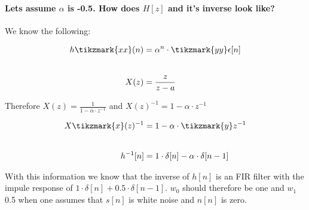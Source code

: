 \paragraph{Lets assume $\alpha$ is -0.5. How does $H[z]$ and it's inverse look like?}
We know the following:\newline
\begin{minipage}{\textwidth}
\begin{align*}
h\tikzmark{xx}(n)&= \alpha^n\cdot\tikzmark{yy}\epsilon[n] \\[2em]
X(z) &= \frac{z}{z-a}
\end{align*}

\end{minipage}
Therefore $X(z)=\frac{1}{1-\alpha \cdot z^{-1} }$ and $X(z)^{-1}=1-\alpha \cdot z^{-1}$\newline
\begin{minipage}{\textwidth}
\begin{align*}
X\tikzmark{x}(z)^{-1}&= 1-\alpha\cdot\tikzmark{y}z^{-1} \\[2em]
h^{-1}[n] &= 1\cdot\delta[n]-\alpha\cdot \delta[n-1]
\end{align*}

\end{minipage}
With this information we know that the inverse of $h[n]$ is an FIR filter with the impule response of $1\cdot\delta[n]+0.5\cdot \delta[n-1]$. $w_0$ should therefore be one and $w_1$ 0.5 when one assumes that $s[n]$ is white noise and $n[n]$ is zero.

